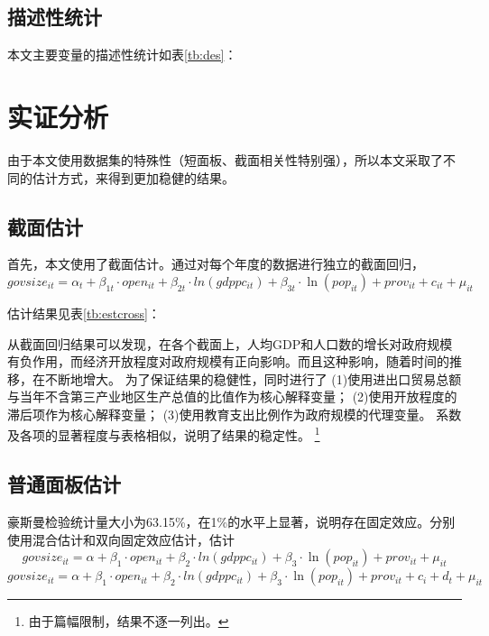 \documentclass[10pt]{article}
\begin{document}
\subsection{描述性统计}
本文主要变量的描述性统计如表\ref{tb:des}：


\section{实证分析}
    由于本文使用数据集的特殊性（短面板、截面相关性特别强），所以本文采取了不同的估计方式，来得到更加稳健的结果。
\subsection{截面估计}
    首先，本文使用了截面估计。通过对每个年度的数据进行独立的截面回归，
    \begin{equation}
        govsize_{it} = \alpha_t + \beta_{1t} \cdot open_{it} + \beta_{2t} \cdot ln(gdppc_{it}) + \beta_{3t} \cdot \ln(pop_{it}) + prov_{it} +c_{it} + \mu_{it}
    \end{equation}


    估计结果见表\ref{tb:estcross}：



        从截面回归结果可以发现，在各个截面上，人均GDP和人口数的增长对政府规模有负作用，而经济开放程度对政府规模有正向影响。而且这种影响，随着时间的推移，在不断地增大。
        为了保证结果的稳健性，同时进行了
        (1)使用进出口贸易总额与当年不含第三产业地区生产总值的比值作为核心解释变量；
        (2)使用开放程度的滞后项作为核心解释变量；
        (3)使用教育支出比例作为政府规模的代理变量。
        系数及各项的显著程度与表格相似，说明了结果的稳定性。
    \footnote{由于篇幅限制，结果不逐一列出。}

\subsection{普通面板估计}
    豪斯曼检验统计量大小为63.15\%，在1\%的水平上显著，说明存在固定效应。分别使用混合估计和双向固定效应估计，估计
    \begin{equation}
        govsize_{it} = \alpha + \beta_{1} \cdot open_{it} + \beta_{2} \cdot ln(gdppc_{it}) + \beta_{3} \cdot \ln(pop_{it}) + prov_{it} + \mu_{it}
    \end{equation}
    \begin{equation}    
        govsize_{it} = \alpha + \beta_{1} \cdot open_{it} + \beta_{2} \cdot ln(gdppc_{it}) + \beta_{3} \cdot \ln(pop_{it}) + prov_{it} +c_{i} +d_{t} + \mu_{it}
    \end{equation}
    
\end{document}
